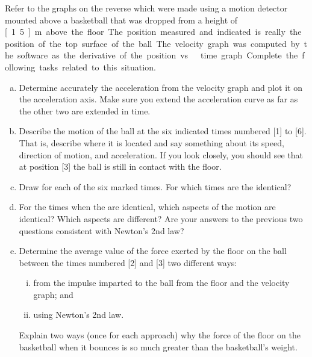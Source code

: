 \label{fnt8.2.1-6}

Refer to the graphs on the reverse which were made using a motion detector mounted above a basketball that was dropped from a height of \unit[1.5]{m} above the floor. The position measured and indicated is really the position of the top surface of the ball. The velocity graph was computed by the software as the derivative of the position vs.\ time graph. Complete the following tasks related to this situation.

\begin{enumerate}[(a)]
	\item Determine accurately the acceleration from the velocity graph and plot it on the acceleration axis. Make sure you extend the acceleration curve as far as the other two are extended in time.
	
	\item Describe the motion of the ball at the six indicated times numbered [1] to [6]. That is, describe where it is located and say something about its speed, direction of motion, and acceleration. If you look closely, you should see that at position [3] the ball is still in contact with the floor.
	
	\item Draw \forcediags{} for each of the six marked times. For which times are the \forcediags{} identical?
	
	\item For the times when the \forcediags{} are identical, which aspects of the motion are identical? Which aspects are different? Are your answers to the previous two questions consistent with Newton's 2nd law?
	
	\item Determine the average value of the force exerted by the floor on the ball between the times numbered [2] and [3] two different ways:
	\begin{enumerate}[(i)]
		\item from the impulse imparted to the ball from the floor and the velocity graph; and 
		\item using Newton's 2nd law.
	\end{enumerate}
	Explain two ways (once for each approach) why the force of the floor on the basketball when it bounces is so much greater than the basketball's weight.
\end{enumerate}